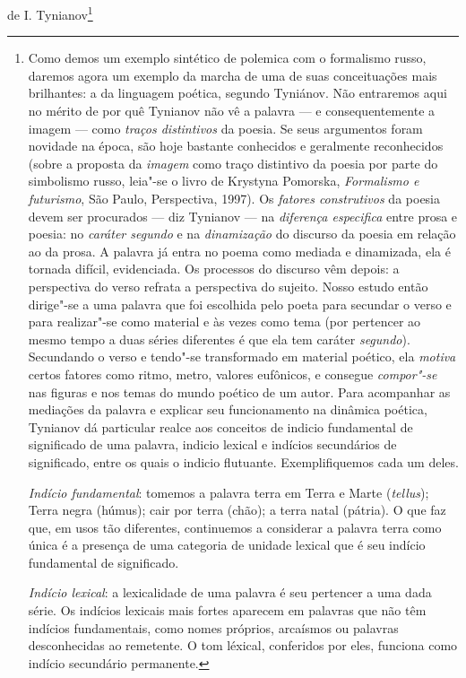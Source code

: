 de I. Tynianov\footnote{Como demos um exemplo sintético de polemica com
  o formalismo russo, daremos agora um exemplo da marcha de uma de suas
  conceituações mais brilhantes: a da linguagem poética, segundo
  Tyniánov. Não entraremos aqui no mérito de por quê Tynianov não vê a
  palavra --- e consequentemente a imagem --- como \emph{traços
  distintivos} da poesia. Se seus argumentos foram novidade na época,
  são hoje bastante conhecidos e geralmente reconhecidos (sobre a
  proposta da \emph{imagem} como traço distintivo da poesia por parte do
  simbolismo russo, leia"-se o livro de Krystyna Pomorska,
  \emph{Formalismo e futurismo}, São Paulo, Perspectiva, 1997). Os
  \emph{fatores construtivos} da poesia devem ser procurados --- diz
  Tynianov --- na \emph{diferença especifica} entre prosa e poesia: no
  \emph{caráter segundo} e na \emph{dinamização} do discurso da poesia
  em relação ao da prosa. A palavra já entra no poema como mediada e
  dinamizada, ela é tornada difícil, evidenciada. Os processos do
  discurso vêm depois: a perspectiva do verso refrata a perspectiva do
  sujeito. Nosso estudo então dirige"-se a uma palavra que foi escolhida
  pelo poeta para secundar o verso e para realizar"-se como material e às
  vezes como tema (por pertencer ao mesmo tempo a duas séries diferentes
  é que ela tem caráter \emph{segundo}). Secundando o verso e tendo"-se
  transformado em material poético, ela \emph{motiva} certos fatores
  como ritmo, metro, valores eufônicos, e consegue \emph{compor"-se} nas
  figuras e nos temas do mundo poético de um autor. Para acompanhar as
  mediações da palavra e explicar seu funcionamento na dinâmica poética,
  Tynianov dá particular realce aos conceitos de indicio fundamental de
  significado de uma palavra, indicio lexical e indícios secundários de
  significado, entre os quais o indicio flutuante. Exemplifiquemos cada
  um deles.

  \emph{Indício fundamental}: tomemos a palavra terra em Terra e Marte
  (\emph{tellus}); Terra negra (húmus); cair por terra (chão); a terra
  natal (pátria). O que faz que, em usos tão diferentes, continuemos a
  considerar a palavra terra como única é a presença de uma categoria de
  unidade lexical que é seu indício fundamental de significado.

  \emph{Indício lexical}: a lexicalidade de uma palavra é seu pertencer
  a uma dada série. Os indícios lexicais mais fortes aparecem em
  palavras que não têm indícios fundamentais, como nomes próprios,
  arcaísmos ou palavras desconhecidas ao remetente. O tom léxical,
  conferidos por eles, funciona como indício secundário permanente.

}
